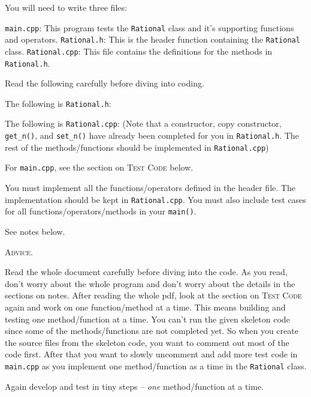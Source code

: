 You will need to write three files:
\begin{tightlist}
  \li \verb!main.cpp!: This program tests the
  \verb!Rational! class and it's supporting functions and operators. 
  \li \verb!Rational.h!: This is the header function containing the
  \verb!Rational! class.
  \li \verb!Rational.cpp!:
  This file contains the definitions for the methods in \verb!Rational.h!.
\end{tightlist}

Read the following carefully before diving into coding.

The following is \verb!Rational.h!:
{\small
{}
}

The following is \verb!Rational.cpp!:
{\small
{}
}
(Note that a constructor, copy constructor, \verb!get_n()!, and
\verb!set_n()! have already been completed for you in \texttt{Rational.h}.
The rest of the methods/functions should be implemented in
\texttt{Rational.cpp})

For \verb!main.cpp!, see the section on \textsc{Test Code} below.

You must implement all the functions/operators defined in the header file.
The implementation should be kept in \verb!Rational.cpp!.
You must also include test cases for all functions/operators/methods in your
\verb!main()!.

See notes below.




\newpage
\textsc{Advice}. 

Read the whole document carefully before diving into the code.
As you read, don't worry about the whole program and don't worry about the
details in the sections on notes.
After reading the whole pdf, look at the section on \textsc{Test Code}
again and work on one function/method at a time.
This means building and testing one
method/function at a time.
You can't run the given skeleton code since some of the methods/functions
are not completed yet.
So when you create the source files from the skeleton code, you
want to comment out most of the code first.
After that you want to slowly
uncomment and add more test code in \verb!main.cpp! as you implement one
method/function as a time 
in the \verb!Rational!
class.

Again develop and test in tiny steps -- \textit{one} method/function at a time.

